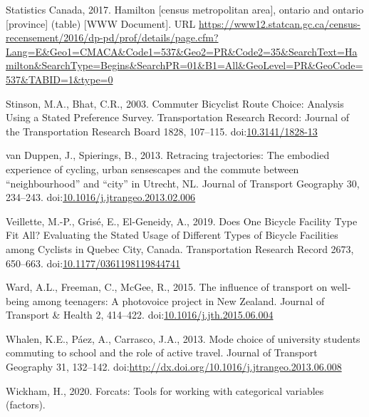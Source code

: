 \documentclass[]{elsarticle} %
\begin{document}
\leavevmode\hypertarget{ref-Statistics2016}{}%
Statistics Canada, 2017. Hamilton {[}census metropolitan area{]},
ontario and ontario {[}province{]} (table) {[}WWW Document{]}. URL
\url{https://www12.statcan.gc.ca/census-recensement/2016/dp-pd/prof/details/page.cfm?Lang=E\&Geo1=CMACA\&Code1=537\&Geo2=PR\&Code2=35\&SearchText=Hamilton\&SearchType=Begins\&SearchPR=01\&B1=All\&GeoLevel=PR\&GeoCode=537\&TABID=1\&type=0}

\leavevmode\hypertarget{ref-stinsonCommuterBicyclistRoute2003}{}%
Stinson, M.A., Bhat, C.R., 2003. Commuter Bicyclist Route Choice:
Analysis Using a Stated Preference Survey. Transportation Research
Record: Journal of the Transportation Research Board 1828, 107--115.
doi:\href{https://doi.org/10.3141/1828-13}{10.3141/1828-13}

\leavevmode\hypertarget{ref-vanduppenRetracingTrajectoriesEmbodied2013}{}%
van Duppen, J., Spierings, B., 2013. Retracing trajectories: The
embodied experience of cycling, urban sensescapes and the commute
between ``neighbourhood'' and ``city'' in Utrecht, NL. Journal of
Transport Geography 30, 234--243.
doi:\href{https://doi.org/10.1016/j.jtrangeo.2013.02.006}{10.1016/j.jtrangeo.2013.02.006}

\leavevmode\hypertarget{ref-veilletteDoesOneBicycle2019}{}%
Veillette, M.-P., Grisé, E., El-Geneidy, A., 2019. Does One Bicycle
Facility Type Fit All? Evaluating the Stated Usage of Different Types of
Bicycle Facilities among Cyclists in Quebec City, Canada. Transportation
Research Record 2673, 650--663.
doi:\href{https://doi.org/10.1177/0361198119844741}{10.1177/0361198119844741}

\leavevmode\hypertarget{ref-wardInfluenceTransportWellbeing2015}{}%
Ward, A.L., Freeman, C., McGee, R., 2015. The influence of transport on
well-being among teenagers: A photovoice project in New Zealand. Journal
of Transport \& Health 2, 414--422.
doi:\href{https://doi.org/10.1016/j.jth.2015.06.004}{10.1016/j.jth.2015.06.004}

\leavevmode\hypertarget{ref-whalenModeChoice2013}{}%
Whalen, K.E., Páez, A., Carrasco, J.A., 2013. Mode choice of university
students commuting to school and the role of active travel. Journal of
Transport Geography 31, 132--142.
doi:\href{https://doi.org/http://dx.doi.org/10.1016/j.jtrangeo.2013.06.008}{http://dx.doi.org/10.1016/j.jtrangeo.2013.06.008}

\leavevmode\hypertarget{ref-R-forcats}{}%
Wickham, H., 2020. Forcats: Tools for working with categorical variables
(factors).
\end{document}
